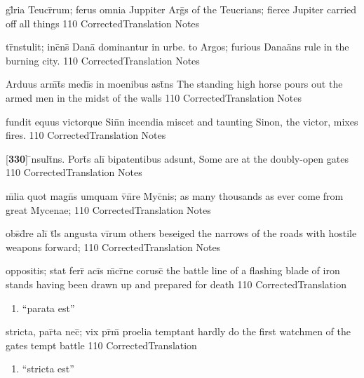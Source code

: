 \latline
  {gl\={}ria Teucr\={}rum; ferus omnia Juppiter Arg\={}s}
  { of the Teucrians; fierce Jupiter carried off all things }
  {110}
  { CorrectedTranslation }
  { Notes }


\latline
  {tr\={}nstulit; inc\={}ns\={} Dana\={\macron {\i}} dominantur in urbe.}
  { to Argos; furious Dana\"ans rule in the burning city.  }
  {110}
  { CorrectedTranslation }
  { Notes }


\latline
  {Arduus arm\={}t\={}s medi\={\macron {\i}}s in moenibus ast\={}ns}
  { The standing high horse pours out the armed men in the midst of the walls }
  {110}
  { CorrectedTranslation }
  { Notes }


\latline
  {fundit equus victorque Sin\={}n incendia miscet}
  { and taunting Sinon, the victor, mixes fires.  }
  {110}
  { CorrectedTranslation }
  { Notes }


\latline
  {[\textbf{330}] \={\macron {\i}}nsult\={}ns.  Port\={\macron {\i}}s ali\={\macron {\i}} bipatentibus adsunt,}
  { Some are at the doubly-open gates }
  {110}
  { CorrectedTranslation }
  { Notes }


\latline
  {m\={\macron {\i}}lia quot magn\={\macron {\i}}s umquam v\={}n\={}re Myc\={}nis;}
  { as many thousands as ever come from great Mycenae; }
  {110}
  { CorrectedTranslation }
  { Notes }


\latline
  {obs\={}d\={}re ali\={\macron {\i}} t\={}l\={\macron {\i}}s angusta vi\={}rum}
  { others beseiged the narrows of the roads with hostile weapons forward;  }
  {110}
  { CorrectedTranslation }
  { Notes }


\latline
  {oppositis; stat ferr\={\macron {\i}} aci\={}s m\={}cr\={}ne corusc\={}}
  { the battle line of a flashing blade of iron stands having been drawn up and prepared for death }
  {110}
  { CorrectedTranslation }
  { \begin{enumerate}
  	\item ``parata est''
  \end{enumerate} }


\latline
  {stricta, par\={}ta nec\={\macron {\i}}; vix pr\={\macron {\i}}m\={\macron {\i}} proelia temptant}
  { hardly do the first watchmen of the gates tempt battle }
  {110}
  { CorrectedTranslation }
  { \begin{enumerate}
  	\item ``stricta est''
  \end{enumerate} }


